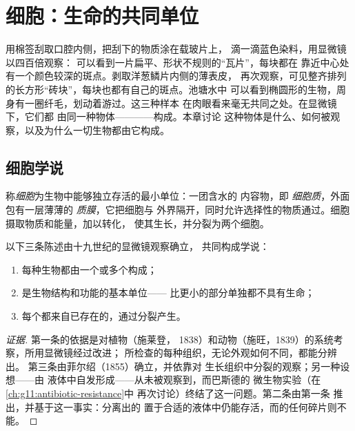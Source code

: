 \chapter{细胞：生命的共同单位}\label{ch:g10:cells-common-unit}

用棉签刮取口腔内侧，把刮下的物质涂在载玻片上，
滴一滴蓝色染料，用显微镜以四百倍观察：
可以看到一片扁平、形状不规则的“瓦片”，每块都在
靠近中心处有一个颜色较深的斑点。剥取洋葱鳞片内侧的薄表皮，
再次观察，可见整齐排列的长方形“砖块”，每块也都有自己的斑点。池塘水中
可以看到椭圆形的生物，周身有一圈纤毛，划动着游过。这三种样本
在肉眼看来毫无共同之处。在显微镜下，它们都
由同一种物体————构成。本章讨论
这种物体是什么、如何被观察，以及为什么一切生物都由它构成。

\section{细胞学说}

\begin{definition}[细胞]\label{def:g10:cells-common-unit:cell}
称\emph{细胞}为生物中能够独立存活的最小单位：一团含水的
内容物，即
\emph{细胞质}，外面包有一层薄薄的
\emph{质膜}，它把细胞与
外界隔开，同时允许选择性的物质通过。细胞
摄取物质和能量，加以转化，
使其生长，并分裂为两个细胞。
\end{definition}

\begin{proposition}[细胞学说]\label{prop:g10:cells-common-unit:theory}
以下三条陈述由十九世纪的显微镜观察确立，
共同构成学说：
\begin{enumerate}
  \item 每种生物都由一个或多个构成；
  \item {}是生物结构和功能的基本单位——
        比更小的部分单独都不具有生命；
  \item 每个都来自已存在的，通过分裂产生。
\end{enumerate}
\end{proposition}
\begin{proof}[证据]
第一条的依据是对植物（施莱登，
1838）和动物（施旺，1839）的系统考察，所用显微镜经过改进；
所检查的每种组织，无论外观如何不同，都能分辨出。
第三条由菲尔绍（1855）确立，并依靠对
生长组织中分裂的观察；另一种设想——由
液体中自发形成——从未被观察到，而巴斯德的
微生物实验（在\cref{ch:g11:antibiotic-resistance}中
再次讨论）终结了这一问题。第二条由第一条
推出，并基于这一事实：分离出的
置于合适的液体中仍能存活，而的任何碎片则不能。
\end{proof}

